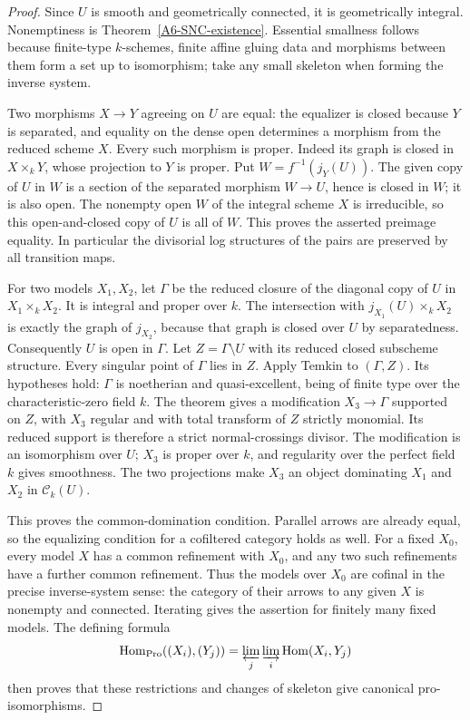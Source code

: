 \begin{proof}
Since $U$ is smooth and geometrically connected, it is geometrically
integral. Nonemptiness is Theorem~\ref{A6-SNC-existence}. Essential
smallness follows because finite-type $k$-schemes, finite affine gluing
data and morphisms between them form a set up to isomorphism; take any
small skeleton when forming the inverse system.

Two morphisms $X\to Y$ agreeing on $U$ are equal: the equalizer is closed
because $Y$ is separated, and equality on the dense open determines a
morphism from the reduced scheme $X$. Every such morphism is proper.
Indeed its graph is closed in $X\times_kY$, whose projection to $Y$ is
proper. Put $W=f^{-1}(j_Y(U))$. The given copy of $U$ in $W$ is a section
of the separated morphism $W\to U$, hence is closed in $W$; it is also
open. The nonempty open $W$ of the integral scheme $X$ is irreducible,
so this open-and-closed copy of $U$ is all of $W$. This proves the asserted
preimage equality. In particular the divisorial log structures of the
pairs are preserved by all transition maps.

For two models $X_1,X_2$, let $\Gamma$ be the reduced closure of the
diagonal copy of $U$ in $X_1\times_kX_2$. It is integral and proper over
$k$. The intersection with $j_{X_1}(U)\times_kX_2$ is exactly the graph
of $j_{X_2}$, because that graph is closed over $U$ by separatedness.
Consequently $U$ is open in $\Gamma$. Let $Z=\Gamma\setminus U$ with
its reduced closed subscheme structure. Every singular point of
$\Gamma$ lies in $Z$. Apply Temkin
\cite[Theorem~1.1.11, p.~4]{Temkin2018A567} to $(\Gamma,Z)$.
Its hypotheses hold: $\Gamma$ is noetherian and quasi-excellent, being
of finite type over the characteristic-zero field $k$. The theorem
gives a modification $X_3\to\Gamma$ supported on $Z$, with $X_3$
regular and with total transform of $Z$ strictly monomial. Its reduced
support is therefore a strict normal-crossings divisor. The modification
is an isomorphism over $U$; $X_3$ is proper over $k$, and regularity over
the perfect field $k$ gives smoothness. The two projections make $X_3$
an object dominating $X_1$ and $X_2$ in $\mathcal C_k(U)$.

This proves the common-domination condition. Parallel arrows are already
equal, so the equalizing condition for a cofiltered category holds as
well. For a fixed $X_0$, every model $X$ has a common refinement with
$X_0$, and any two such refinements have a further common refinement.
Thus the models over $X_0$ are cofinal in the precise inverse-system
sense: the category of their arrows to any given $X$ is nonempty and
connected. Iterating gives the assertion for finitely many fixed models.
The defining formula
\[
 \operatorname{Hom}_{\mathrm{Pro}}
       ((X_i),(Y_j))
   =\varprojlim_j\varinjlim_i\operatorname{Hom}(X_i,Y_j)
\]
then proves that these restrictions and changes of skeleton give
canonical pro-isomorphisms.


\end{proof}
